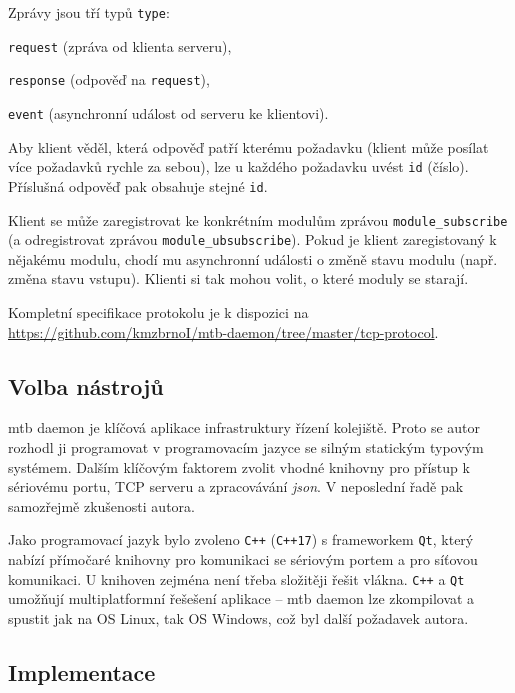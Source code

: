 Zprávy jsou tří typů \texttt{type}:

\begin{compactenum}
\item \texttt{request} (zpráva od klienta serveru),
\item \texttt{response} (odpověď na \texttt{request}),
\item \texttt{event} (asynchronní událost od serveru ke klientovi).
\end{compactenum}

Aby klient věděl, která odpověď patří kterému požadavku (klient může posílat
více požadavků rychle za sebou), lze u každého požadavku uvést \texttt{id}
(číslo). Příslušná odpověď pak obsahuje stejné \texttt{id}.

Klient se může zaregistrovat ke konkrétním modulům zprávou
\texttt{module\_subscribe} (a odregistrovat zprávou
\texttt{module\_ubsubscribe}). Pokud je klient zaregistovaný k nějakému modulu,
chodí mu asynchronní události o změně stavu modulu (např. změna stavu vstupu).
Klienti si tak mohou volit, o které moduly se starají.

Kompletní specifikace protokolu je k dispozici na
\url{https://github.com/kmzbrnoI/mtb-daemon/tree/master/tcp-protocol}.

\subsection{Volba nástrojů} \label{sec:daemon:tools}

\gls{mtb} daemon je klíčová aplikace infrastruktury řízení kolejiště. Proto se
autor rozhodl ji programovat v programovacím jazyce se silným statickým typovým
systémem. Dalším klíčovým faktorem zvolit vhodné knihovny pro přístup k
sériovému portu, TCP serveru a zpracovávání \textit{json}. V neposlední řadě
pak samozřejmě zkušenosti autora.

Jako programovací jazyk bylo zvoleno \texttt{C++} (\texttt{C++17}) s
frameworkem \texttt{Qt}, který nabízí přímočaré knihovny pro komunikaci se
sériovým portem a pro síťovou komunikaci. U knihoven zejména není třeba
složitěji řešit vlákna. \texttt{C++} a \texttt{Qt} umožňují multiplatformní
řešešení aplikace – \gls{mtb} daemon lze zkompilovat a spustit jak na OS Linux,
tak OS Windows, což byl další požadavek autora.

\subsection{Implementace} \label{sec:daemon:impl}

